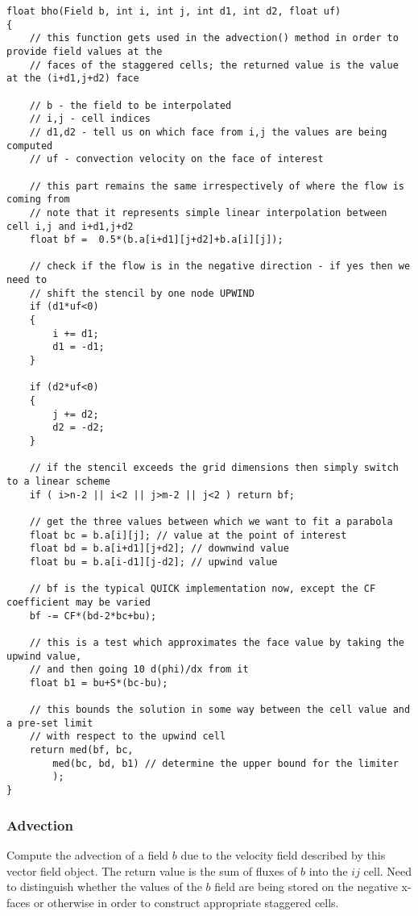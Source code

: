 \documentclass[notitlepage]{article}
\begin{document}
\begin{lstlisting}[style=myCpp]
float bho(Field b, int i, int j, int d1, int d2, float uf)
{
	// this function gets used in the advection() method in order to provide field values at the
	// faces of the staggered cells; the returned value is the value at the (i+d1,j+d2) face
		
	// b - the field to be interpolated
	// i,j - cell indices
	// d1,d2 - tell us on which face from i,j the values are being computed
	// uf - convection velocity on the face of interest
	
	// this part remains the same irrespectively of where the flow is coming from
	// note that it represents simple linear interpolation between cell i,j and i+d1,j+d2
	float bf =  0.5*(b.a[i+d1][j+d2]+b.a[i][j]);
	
	// check if the flow is in the negative direction - if yes then we need to
	// shift the stencil by one node UPWIND
	if (d1*uf<0)
	{
		i += d1; 
		d1 = -d1;
	}
	
	if (d2*uf<0)
	{
		j += d2;
		d2 = -d2;
	}
	
	// if the stencil exceeds the grid dimensions then simply switch to a linear scheme
	if ( i>n-2 || i<2 || j>m-2 || j<2 ) return bf;
	
	// get the three values between which we want to fit a parabola
	float bc = b.a[i][j]; // value at the point of interest
	float bd = b.a[i+d1][j+d2]; // downwind value
	float bu = b.a[i-d1][j-d2]; // upwind value
	
	// bf is the typical QUICK implementation now, except the CF coefficient may be varied
	bf -= CF*(bd-2*bc+bu);
	
	// this is a test which approximates the face value by taking the upwind value,
	// and then going 10 d(phi)/dx from it
	float b1 = bu+S*(bc-bu);
	
	// this bounds the solution in some way between the cell value and a pre-set limit
	// with respect to the upwind cell
	return med(bf, bc,
		med(bc, bd, b1) // determine the upper bound for the limiter
		);
}
\end{lstlisting}

\subsubsection{Advection}

Compute the advection of a field $b$ due to the velocity field described by this vector field object.
The return value is the sum of fluxes of $b$ into the $ij$ cell. Need to distinguish whether the values
of the $b$ field are being stored on the negative x-faces or otherwise in order to construct appropriate
staggered cells.
\end{document}
